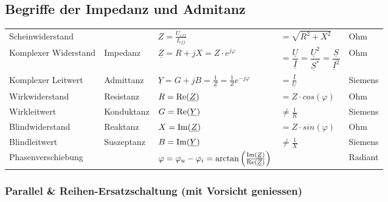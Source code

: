 	\subsection{Begriffe der Impedanz und Admitanz}
		\begin{tabular}{lllll}
		Scheinwiderstand & & $Z = \frac{U_{eff}}{I_{eff}} $ & $ =
		\sqrt{R^2+X^2}$ & Ohm\\ Komplexer Widerstand & Impedanz & $\underline Z = R + jX = Z \cdot e^{j \varphi}$ 
		& $  = \dfrac{\underline{U}}{\underline{I}} = \dfrac{\underline{U}^2}{\underline{S}^*} = 
		\dfrac{\underline{S}}{\underline{I}^2}$ & Ohm\\
		Komplexer Leitwert & Admittanz & $\underline Y = G + jB =
		\frac{1}{\underline Z} = \frac{1}{Z}e^{-j\varphi}$ & $= \frac{\underline{I}}{\underline{U}}$ &  Siemens\\
		Wirkwiderstand & Resistanz & $R = \operatorname{Re}(\underline Z) $ & $ = Z
		\cdot cos(\varphi)$ & Ohm\\
		Wirkleitwert & Konduktanz & $G = \operatorname{Re}(\underline Y) $ & $ \neq \frac{1}{R}$ &
		Siemens\\
		Blindwiderstand & Reaktanz & $X = \operatorname{Im}(\underline Z) $ & $ = Z
		\cdot sin(\varphi)$ & Ohm\\
		Blindleitwert & Suszeptanz & $B = \operatorname{Im}( \underline Y) $ & $ \neq \frac{1}{X}$
		& Siemens\\
		Phasenverschiebung & & $\varphi = \varphi_u - \varphi_i =
		\arctan\left(\frac{\operatorname{Im}(\underline{Z})}{\operatorname{Re}(\underline{Z})}\right)$ & &
		Radiant\\
		
		\end{tabular}
	
	\subsubsection{Parallel \& Reihen-Ersatzschaltung (mit Vorsicht geniessen)}
		

